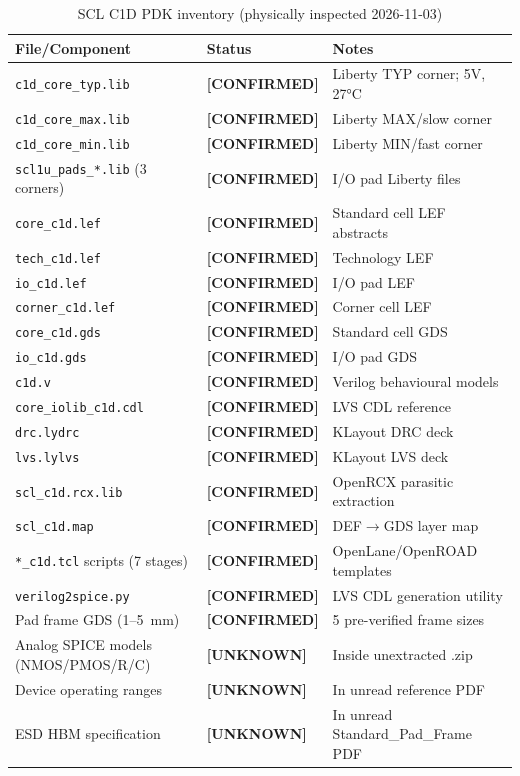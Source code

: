 \documentclass[11pt,a4paper]{article}
\newcommand{\unknown}{\textcolor{unknown}{\textbf{[UNKNOWN]}}}
\newcommand{\confirmed}{\textcolor{frozen}{\textbf{[CONFIRMED]}}}
\begin{document}
\begin{table}[H]
  \centering
  \caption{SCL C1D PDK inventory (physically inspected 2026-11-03)}
  \small
  \begin{tabularx}{\textwidth}{llX}
    \toprule
    \textbf{File/Component} & \textbf{Status} & \textbf{Notes} \\
    \midrule
    \texttt{c1d\_core\_typ.lib} & \confirmed & Liberty TYP corner; 5V, 27°C \\
    \texttt{c1d\_core\_max.lib} & \confirmed & Liberty MAX/slow corner \\
    \texttt{c1d\_core\_min.lib} & \confirmed & Liberty MIN/fast corner \\
    \texttt{scl1u\_pads\_*.lib} (3 corners) & \confirmed & I/O pad Liberty files \\
    \texttt{core\_c1d.lef} & \confirmed & Standard cell LEF abstracts \\
    \texttt{tech\_c1d.lef} & \confirmed & Technology LEF \\
    \texttt{io\_c1d.lef} & \confirmed & I/O pad LEF \\
    \texttt{corner\_c1d.lef} & \confirmed & Corner cell LEF \\
    \texttt{core\_c1d.gds} & \confirmed & Standard cell GDS \\
    \texttt{io\_c1d.gds} & \confirmed & I/O pad GDS \\
    \texttt{c1d.v} & \confirmed & Verilog behavioural models \\
    \texttt{core\_iolib\_c1d.cdl} & \confirmed & LVS CDL reference \\
    \texttt{drc.lydrc} & \confirmed & KLayout DRC deck \\
    \texttt{lvs.lylvs} & \confirmed & KLayout LVS deck \\
    \texttt{scl\_c1d.rcx.lib} & \confirmed & OpenRCX parasitic extraction \\
    \texttt{scl\_c1d.map} & \confirmed & DEF$\to$GDS layer map \\
    \texttt{*\_c1d.tcl} scripts (7 stages) & \confirmed & OpenLane/OpenROAD templates \\
    \texttt{verilog2spice.py} & \confirmed & LVS CDL generation utility \\
    Pad frame GDS (1--5~mm) & \confirmed & 5 pre-verified frame sizes \\
    Analog SPICE models (NMOS/PMOS/R/C) & \unknown & Inside unextracted .zip \\
    Device operating ranges & \unknown & In unread reference PDF \\
    ESD HBM specification & \unknown & In unread Standard\_Pad\_Frame PDF \\
    \bottomrule
  \end{tabularx}
\end{table}
\end{document}
